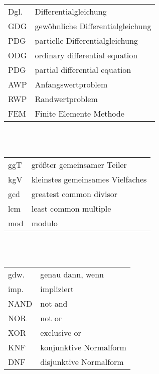 \\[2pt]
\begin{tabular}{ll}
Dgl. & Differentialgleichung\\
GDG & gewöhnliche Differentialgleichung\\
PDG & partielle Differentialgleichung\\
ODG & ordinary differential equation\\
PDG & partial differential equation\\
AWP & Anfangswertproblem\\
RWP & Randwertproblem\\
FEM & Finite Elemente Methode
\end{tabular}\\[4pt]
\\[2pt]
\begin{tabular}{ll}
ggT & größter gemeinsamer Teiler\\
kgV & kleinstes gemeinsames Vielfaches\\
gcd & greatest common divisor\\
lcm & least common multiple\\
mod & modulo
\end{tabular}\\[4pt]
\\[2pt]
\begin{tabular}{ll}
gdw. & genau dann, wenn\\
imp. & impliziert\\
NAND & not and\\
NOR & not or\\
XOR & exclusive or\\
KNF & konjunktive Normalform\\
DNF & disjunktive Normalform
\end{tabular}
